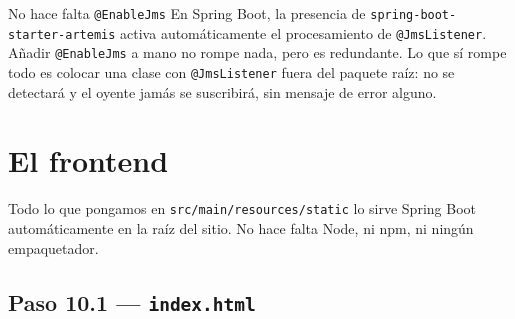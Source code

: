 \documentclass[11pt,a4paper]{book}
\newcommand{\ruta}[1]{\texttt{#1}}
\begin{document}
\begin{cajaAviso}{No hace falta \texttt{@EnableJms}}
	En Spring Boot, la presencia de \texttt{spring-boot-starter-artemis} activa automáticamente el procesamiento de \texttt{@JmsListener}.
	Añadir \texttt{@EnableJms} a mano no rompe nada, pero es redundante.
	Lo que sí rompe todo es colocar una clase con \texttt{@JmsListener} fuera del paquete raíz: no se detectará y el oyente jamás se suscribirá, sin mensaje de error alguno.
\end{cajaAviso}

\chapter{El frontend}
\label{cap:frontend}

Todo lo que pongamos en \ruta{src/main/resources/static} lo sirve Spring Boot automáticamente en la raíz del sitio.
No hace falta Node, ni npm, ni ningún empaquetador.

\section{Paso 10.1 --- \texttt{index.html}}
\end{document}
